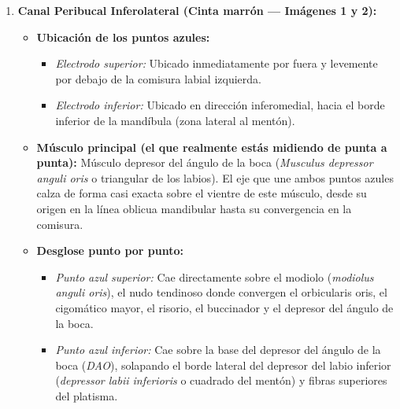 \documentclass[11pt,a4paper]{article}
\begin{document}
\begin{enumerate}
    \item \textbf{Canal Peribucal Inferolateral (Cinta marrón — Imágenes 1 y 2):}
    \begin{itemize}
        \item \textbf{Ubicación de los puntos azules:}
        \begin{itemize}
            \item \textit{Electrodo superior:} Ubicado inmediatamente por fuera y levemente por debajo de la comisura labial izquierda.
            \item \textit{Electrodo inferior:} Ubicado en dirección inferomedial, hacia el borde inferior de la mandíbula (zona lateral al mentón).
        \end{itemize}
        \item \textbf{Músculo principal (el que realmente estás midiendo de punta a punta):} Músculo depresor del ángulo de la boca (\textit{Musculus depressor anguli oris} o triangular de los labios). El eje que une ambos puntos azules calza de forma casi exacta sobre el vientre de este músculo, desde su origen en la línea oblicua mandibular hasta su convergencia en la comisura.
        \item \textbf{Desglose punto por punto:}
        \begin{itemize}
            \item \textit{Punto azul superior:} Cae directamente sobre el modiolo (\textit{modiolus anguli oris}), el nudo tendinoso donde convergen el orbicularis oris, el cigomático mayor, el risorio, el buccinador y el depresor del ángulo de la boca.
            \item \textit{Punto azul inferior:} Cae sobre la base del depresor del ángulo de la boca (\textit{DAO}), solapando el borde lateral del depresor del labio inferior (\textit{depressor labii inferioris} o cuadrado del mentón) y fibras superiores del platisma.
        \end{itemize}
    \end{itemize}


\end{enumerate}
\end{document}
